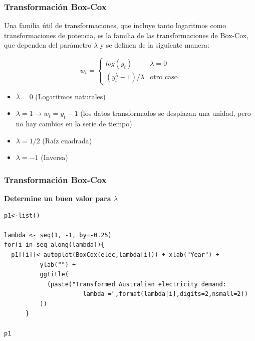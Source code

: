 \documentclass[10pt]{beamer}
\begin{document}
\begin{frame}
\frametitle{Transformación Box-Cox}

Una familia útil de transformaciones, que incluye tanto logaritmos como transformaciones de potencia, es la familia de las transformaciones de Box-Cox, que dependen del parámetro $\lambda$ y se definen de la siguiente manera:


\begin{equation}
w_t = 
   \begin{cases} 
      log(y_t)              & \lambda = 0   \\
      (y_t^\lambda -1) / \lambda & \mbox{otro caso}
   \end{cases}
\end{equation}

\pause

\begin{itemize}
\small
\item $\lambda = 0$ (Logaritmos naturales)
\item $\lambda = 1 \longrightarrow w_t = y_t - 1$ (los datos transformados se desplazan una unidad, pero no hay cambios en la serie de tiempo)
\item $\lambda = 1/2$ (Raíz cuadrada)
\item $\lambda = -1$ (Inversa)
\end{itemize}

{\small
\begin{center}
\end{center}
}
\end{frame}







\begin{frame}[fragile]
\frametitle{Transformación Box-Cox}

\textbf{Determine un buen valor para $\lambda$}

\lstset{language=r,label= ,caption= ,captionpos=b,numbers=none}
\begin{lstlisting}
p1<-list()

lambda <- seq(1, -1, by=-0.25)
for(i in seq_along(lambda)){
  p1[[i]]<-autoplot(BoxCox(elec,lambda[i])) + xlab("Year") +
          ylab("") +
          ggtitle(
            (paste("Transformed Australian electricity demand:  
                      lambda =",format(lambda[i],digits=2,nsmall=2))
          ))
      }

p1
\end{lstlisting}



\end{frame}
\end{document}
